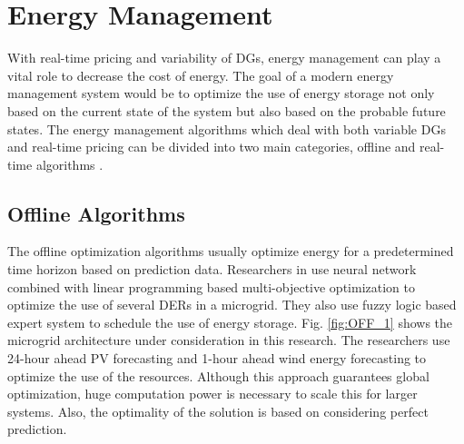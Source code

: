 
\section{Energy Management}
With real-time pricing and variability of DGs, energy management can play a vital role to decrease the cost of energy. The goal of a modern energy management system would be to optimize the use of energy storage not only based on the current state of the system but also based on the probable future states. The energy management algorithms which deal with both variable DGs and real-time pricing can be divided into two main categories, offline and real-time algorithms \cite{Wen17}. 
\subsection{Offline Algorithms}
The offline optimization algorithms usually optimize energy for a predetermined time horizon based on prediction data. Researchers in \cite{ACh13} use neural network combined with linear programming based multi-objective optimization to optimize the use of several DERs in a microgrid. They also use fuzzy logic based expert system to schedule the use of energy storage. Fig. \ref{fig:OFF_1} shows the microgrid architecture under consideration in this research. The researchers use 24-hour ahead PV forecasting and 1-hour ahead wind energy forecasting to optimize the use of the resources. Although this approach guarantees global optimization, huge computation power is necessary to scale this for larger systems. Also, the optimality of the solution is based on considering perfect prediction.


